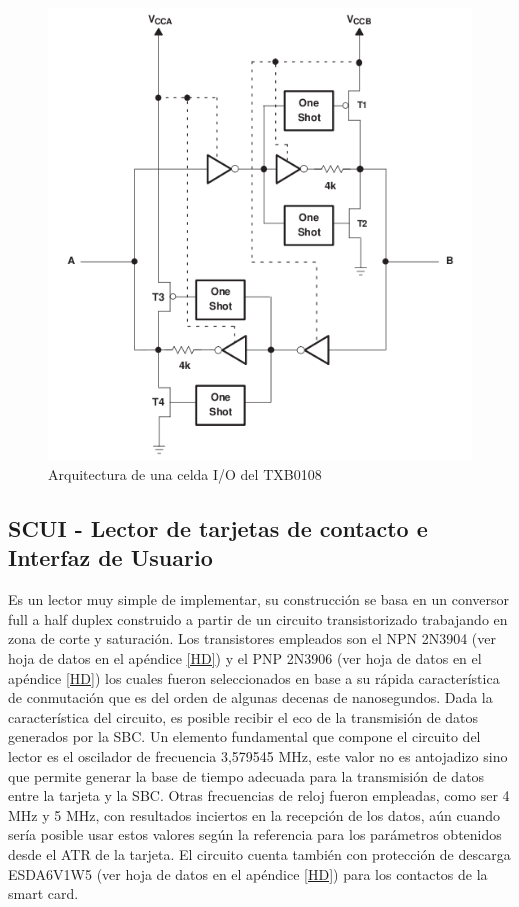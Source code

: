 \bigskip
\bigskip
\begin{figure}[H]
\centering
  \begin{center}
  \includegraphics[scale=.3]{Imagenes/TXB0108.png} 
  \end{center}
  \caption{Arquitectura de una celda I/O del TXB0108}\label{Fig:Celda_TXB0108} 
\end{figure}


\subsection{SCUI - Lector de tarjetas de contacto e Interfaz de Usuario}


Es un lector muy simple de implementar, su construcción se basa en un conversor full a half duplex construido a partir de un circuito transistorizado trabajando en zona de corte y saturación. Los transistores empleados son el NPN 2N3904 (ver hoja de datos en el apéndice \ref{HD}) y el PNP 2N3906 (ver hoja de datos en el apéndice \ref{HD}) los cuales fueron seleccionados en base a su rápida característica de conmutación que es del orden de algunas decenas de nanosegundos. Dada la característica del circuito, es posible recibir el eco de la transmisión de datos generados por la SBC. 
Un elemento fundamental que compone el circuito del lector es el oscilador de frecuencia 3,579545 MHz, este valor no es antojadizo sino que permite generar la base de tiempo adecuada para la transmisión de datos entre la tarjeta y la SBC. Otras frecuencias de reloj fueron empleadas, como ser 4 MHz y 5 MHz, con resultados inciertos en la recepción de los datos, aún cuando sería posible usar estos valores según la referencia \cite{SCHb} para los parámetros obtenidos desde el ATR de la tarjeta. 
El circuito cuenta también con protección de descarga ESDA6V1W5 (ver hoja de datos en el apéndice \ref{HD}) para los contactos de la smart card.

